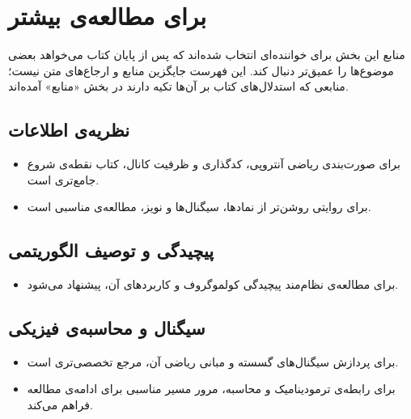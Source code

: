 \chapter*{برای مطالعه‌ی بیشتر}

منابع این بخش برای خواننده‌ای انتخاب شده‌اند که پس از پایان کتاب می‌خواهد بعضی موضوع‌ها را عمیق‌تر دنبال کند. این فهرست جایگزین منابع و ارجاع‌های متن نیست؛ منابعی که استدلال‌های کتاب بر آن‌ها تکیه دارند در بخش «منابع» آمده‌اند.

\section*{نظریه‌ی اطلاعات}
\begin{itemize}
  \item برای صورت‌بندی ریاضی آنتروپی، کدگذاری و ظرفیت کانال، کتاب  نقطه‌ی شروع جامع‌تری است.
  \item برای روایتی روشن‌تر از نمادها، سیگنال‌ها و نویز،  مطالعه‌ی مناسبی است.
\end{itemize}

\section*{پیچیدگی و توصیف الگوریتمی}
\begin{itemize}
  \item برای مطالعه‌ی نظام‌مند پیچیدگی کولموگروف و کاربردهای آن،  پیشنهاد می‌شود.
\end{itemize}

\section*{سیگنال و محاسبه‌ی فیزیکی}
\begin{itemize}
  \item برای پردازش سیگنال‌های گسسته و مبانی ریاضی آن،  مرجع تخصصی‌تری است.
  \item برای رابطه‌ی ترمودینامیک و محاسبه، مرور  مسیر مناسبی برای ادامه‌ی مطالعه فراهم می‌کند.
\end{itemize}
